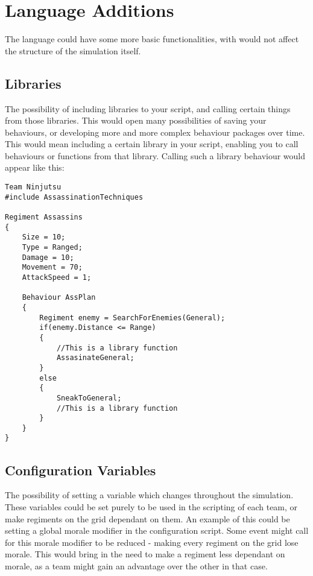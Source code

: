 \section{Language Additions}
The language could have some more basic functionalities, with would not affect the structure of the simulation itself.
\subsection{Libraries}
The possibility of including libraries to your script, and calling certain things from those libraries. This would open many possibilities of saving your behaviours, or developing more and more complex behaviour packages over time. This would mean including a certain library in your script, enabling you to call behaviours or functions from that library. Calling such a library behaviour would appear like this:

\begin{lstlisting}
Team Ninjutsu
#include AssassinationTechniques

Regiment Assassins
{
	Size = 10;
	Type = Ranged;
	Damage = 10;
	Movement = 70;
	AttackSpeed = 1;
	
	Behaviour AssPlan
	{
		Regiment enemy = SearchForEnemies(General);
		if(enemy.Distance <= Range)
		{
			//This is a library function
			AssasinateGeneral; 
		}
		else
		{
			SneakToGeneral;
			//This is a library function
		}
	}
}

\end{lstlisting}


\subsection{Configuration Variables}
The possibility of setting a variable which changes throughout the simulation. These variables could be set purely to be used in the scripting of each team, or make regiments on the grid dependant on them.
An example of this could be setting a global morale modifier in the configuration script. Some event might call for this morale modifier to be reduced - making every regiment on the grid lose morale. This would bring in the need to make a regiment less dependant on morale, as a team might gain an advantage over the other in that case.
